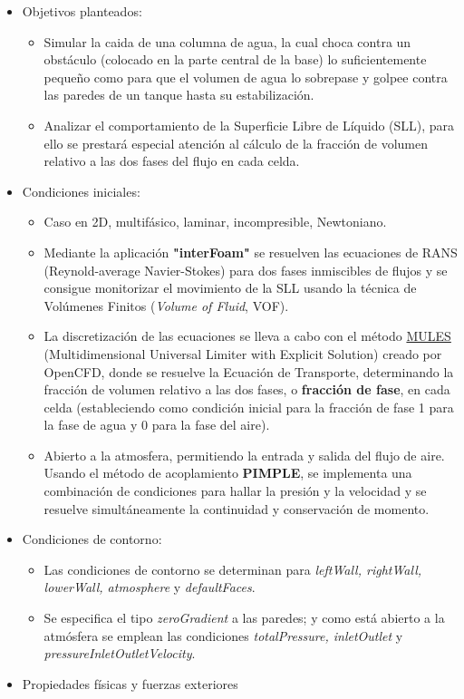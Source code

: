 \begin{itemize}
\item
  Objetivos planteados:

  \begin{itemize}
  \item
    Simular la caida de una columna de agua, la cual choca contra un
    obstáculo (colocado en la parte central de la base) lo
    suficientemente pequeño como para que el volumen de agua lo
    sobrepase y golpee contra las paredes de un tanque hasta su
    estabilización.
  \item
    Analizar el comportamiento de la Superficie Libre de Líquido (SLL),
    para ello se prestará especial atención al cálculo de la fracción de
    volumen relativo a las dos fases del flujo en cada celda.
  \end{itemize}
\item
  Condiciones iniciales:

  \begin{itemize}
  \item
    Caso en 2D, multifásico, laminar, incompresible, Newtoniano. \\
  \item
    Mediante la aplicación \textbf{"interFoam"} se resuelven las
    ecuaciones de RANS (Reynold-average Navier-Stokes) para dos fases
    inmiscibles de flujos y se consigue monitorizar el movimiento de la
    SLL usando la técnica de Volúmenes Finitos (\emph{Volume of Fluid},
    VOF).
  \item
    La discretización de las ecuaciones se lleva a cabo con el método
    \href{http://www.openfoam.org/version2.3.0/multiphase.php}{MULES}
    (Multidimensional Universal Limiter with Explicit Solution) creado
    por OpenCFD, donde se resuelve la Ecuación de Transporte,
    determinando la fracción de volumen relativo a las dos fases, o
    \textbf{fracción de fase}, en cada celda (estableciendo como
    condición inicial para la fracción de fase 1 para la fase de agua y
    0 para la fase del aire).
  \item
    Abierto a la atmosfera, permitiendo la entrada y salida del flujo de
    aire. Usando el método de acoplamiento \textbf{PIMPLE}, se
    implementa una combinación de condiciones para hallar la presión y
    la velocidad y se resuelve simultáneamente la continuidad y
    conservación de momento.
  \end{itemize}
\item
  Condiciones de contorno:

  \begin{itemize}
  \item
    Las condiciones de contorno se determinan para \emph{leftWall,
    rightWall, lowerWall, atmosphere} y \emph{defaultFaces}.
  \item
    Se especifica el tipo \emph{zeroGradient} a las paredes; y como está
    abierto a la atmósfera se emplean las condiciones
    \emph{totalPressure, inletOutlet} y
    \emph{pressureInletOutletVelocity}.
  \end{itemize}
\item
  Propiedades físicas y fuerzas exteriores


\end{itemize}
